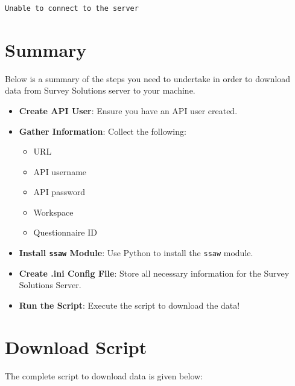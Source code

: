 \documentclass[
  letterpaper,
  DIV=11,
  numbers=noendperiod]{scrreprt}
\providecommand{\tightlist}{%
  \setlength{\itemsep}{0pt}\setlength{\parskip}{0pt}}\usepackage{longtable,booktabs,array}
\begin{document}
\begin{verbatim}
Unable to connect to the server
\end{verbatim}

\section{Summary}\label{summary}

Below is a summary of the steps you need to undertake in order to
download data from Survey Solutions server to your machine.

\begin{itemize}
\tightlist
\item
  \textbf{Create API User}: Ensure you have an API user created.
\end{itemize}

\begin{itemize}
\item
  \textbf{Gather Information}: Collect the following:

  \begin{itemize}
  \item
    URL
  \item
    API username
  \item
    API password
  \item
    Workspace
  \item
    Questionnaire ID
  \end{itemize}
\item
  \textbf{Install \texttt{ssaw} Module}: Use Python to install the
  \texttt{ssaw} module.
\item
  \textbf{Create .ini Config File}: Store all necessary information for
  the Survey Solutions Server.
\item
  \textbf{Run the Script}: Execute the script to download the data!
\end{itemize}

\section{Download Script}\label{download-script}

The complete script to download data is given below:
\end{document}
